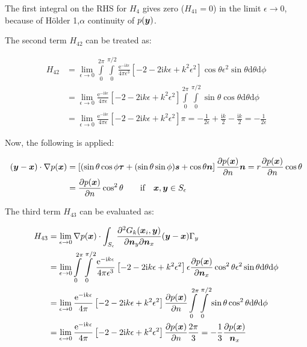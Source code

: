 \documentclass[a4paper, 10pt]{article}
\newcommand{\te}{\mathrm{e}}
\newcommand{\ti}{\mathrm{i}}
\newcommand{\sx}{\bm{\mathnormal{x}}}
\newcommand{\sy}{\bm{\mathnormal{y}}}
\newcommand{\sn}{\bm{\mathnormal{n}}}
\newcommand{\limeps}{\lim\limits_{\epsilon \rightarrow 0}}
\newcommand{\intsph}{\int\limits_{0}^{2\pi} \int\limits_{0}^{\pi/2}}
\newcommand{\dsph}{\mathrm{d}\theta \mathrm{d}\phi}
\begin{document}
The first integral on the RHS for $H_4$ gives zero ($H_{41} = 0$) in the limit $\epsilon \rightarrow 0$, because of Hölder 1,$\alpha$ continuity of $p(\sy)$. 

The second term $H_{42}$ can be treated as:

\begin{align}
	H_{42} &  = \limeps \intsph \frac{\te ^{-\ti k \epsilon}}{4 \pi \epsilon^3}\left[-2 -2\ti k \epsilon + k^2 \epsilon^2\right] \cos \theta \epsilon^2 \sin \theta \dsph \nonumber \\
	& = \limeps \frac{\te ^{-\ti k \epsilon}}{4 \pi \epsilon}\left[-2 -2\ti k \epsilon + k^2 \epsilon^2\right] \intsph \sin \theta \cos \theta \dsph \nonumber \\
	& = \limeps \frac{\te ^{-\ti k \epsilon}}{4 \pi \epsilon}\left[-2 -2\ti k \epsilon + k^2 \epsilon^2\right] \pi = - \frac{1}{2 \epsilon} + \frac{\ti k}{2} - \frac{\ti k}{2} = -\frac{1}{2 \epsilon} 
\end{align}

Now, the following is applied:

\begin{align}
	(\sy - \sx) \cdot \nabla p(\sx) & = \left[(\sin \theta \cos \phi \bm{\tau} + (\sin\theta \sin\phi)\bm{s} + \cos \theta \bm{n}
	\right] \frac{\partial p(\sx)}{\partial n} \bm{n} = r \frac{\partial p(\sx)}{\partial n} \cos \theta \nonumber \\
	& = \frac{\partial p(\sx)}{\partial n} \cos^2 \theta \qquad \text{if} \quad \sx, \sy \in S_\epsilon
\end{align}

The third term $H_{43}$ can be evaluated as:

\begin{align}
	H_{43} & = \limeps\nabla p(\sx) \cdot \int_{S_\epsilon} \frac{\partial^2{G}_k (\sx_i, \sy)}{\partial \sn_y \partial \sn_x} (\sy - \sx) \Gamma_y \nonumber \\
	&= \limeps \intsph \frac{\te^{-\ti k \epsilon}}{4 \pi \epsilon^3}\left[-2 -2\ti k \epsilon + k^2 \epsilon^2\right] \epsilon \frac{\partial p(\sx)}{\partial \sn_x} \cos^2 \theta \epsilon^2 \sin \theta \dsph \nonumber \\
	&= \limeps \frac{\te^{-\ti k \epsilon}}{4 \pi}\left[-2 -2\ti k \epsilon + k^2 \epsilon^2\right] \frac{\partial p(\sx)}{\partial n} \intsph \sin \theta \cos^2 \theta \dsph \nonumber \\
	& = \limeps \frac{\te^{-\ti k \epsilon}}{4 \pi}\left[-2 -2\ti k \epsilon + k^2 \epsilon^2\right] \frac{\partial p(\sx)}{\partial n} \frac{2 \pi}{3} = -\frac{1}{3} \frac{\partial{p(\sx)}}{\sn_x}
\end{align}
\end{document}
